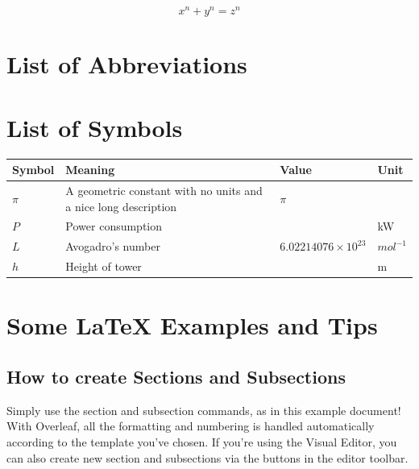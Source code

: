 \documentclass{article}
\begin{document}
\begin{equation}
    \label{eqn:foo}
    x^n + y^n = z^n 
\end{equation}

\newpage
\section{List of Abbreviations}
\label{sec:acronym}



\printglossary[type=\acronymtype]
\glsaddallunused[\acronymtype]

\newpage
\section{List of Symbols}
\begin{table}[h!]
\begin{tabular}{@{}llll@{}}
\toprule
Symbol & Meaning                            & Value & Unit \\ \midrule
$\pi$    & A geometric constant with no units and a nice long description& $\pi$   &      \\
$P$    & Power consumption                  &       & kW   \\
$L$    & Avogadro's number                  &   $6.02214076 \times 10^{23}$    & $mol^{-1}$   \\
$h$    & Height of tower                    &       & m    \\ \bottomrule
\end{tabular}
\end{table}

\newpage
\section{Some \LaTeX{} Examples and Tips}


\subsection{How to create Sections and Subsections}

Simply use the section and subsection commands, as in this example document! With Overleaf, all the formatting and numbering is handled automatically according to the template you've chosen. If you're using the Visual Editor, you can also create new section and subsections via the buttons in the editor toolbar.
\end{document}
